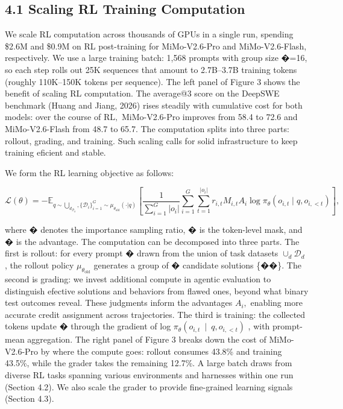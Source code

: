 \documentclass[
  10
]{article}
\begin{document}
\subsection{4.1 Scaling RL Training
Computation}\label{scaling-rl-training-computation}

We scale RL computation across thousands of GPUs in a single run,
spending \$2.6M and \$0.9M on RL post-training for MiMo-V2.6-Pro and
MiMo-V2.6-Flash, respectively. We use a large training batch: 1,568
prompts with group size �=16, so each step rolls out 25K sequences that
amount to 2.7B--3.7B training tokens (roughly 110K--150K tokens per
sequence). The left panel of Figure 3 shows the benefit of scaling RL
computation. The average@3 score on the DeepSWE benchmark (Huang and
Jiang, 2026) rises steadily with cumulative cost for both models: over
the course of \(\mathrm { R L } ,\) MiMo-V2.6-Pro improves from 58.4 to
72.6 and MiMo-V2.6-Flash from 48.7 to 65.7. The computation splits into
three parts: rollout, grading, and training. Such scaling calls for
solid infrastructure to keep training eficient and stable.

We form the RL learning objective as follows:

\[
\mathcal { L } ( \theta ) = - \mathbb { E } _ { q \sim \bigcup _ { d } _ { \mathbf { \mathcal { D } } _ { d } } , \{ \mathbf { \mathcal { D } } _ { i } \} _ { i = 1 } ^ { G } \sim \mu _ { \theta _ { \mathrm { o l d } } } ( \cdot | q ) } \left[ \frac { 1 } { \sum _ { i = 1 } ^ { G } | o _ { i } | } \sum _ { i = 1 } ^ { G } \sum _ { t = 1 } ^ { | o _ { i } | } r _ { i , t } M _ { i , t } A _ { i } \log \pi _ { \theta } ( o _ { i , t } \mid q , o _ { i , < t } ) \right] ,\tag{1}
\]

where � denotes the importance sampling ratio, � is the token-level
mask, and � is the advantage. The computation can be decomposed into
three parts. The first is rollout: for every prompt � drawn from the
union of task datasets \(\cup _ { d } \mathcal { D } _ { d }\) , the
rollout policy \(\mu _ { \theta _ { \mathrm { o l d } } }\) generates a
group of � candidate solutions \{��\}. The second is grading: we invest
additional compute in agentic evaluation to distinguish efective
solutions and behaviors from flawed ones, beyond what binary test
outcomes reveal. These judgments inform the advantages \(A _ { i } ,\)
enabling more accurate credit assignment across trajectories. The third
is training: the collected tokens update � through the gradient of log
\(\pi _ { \theta } ( o _ { i , t } ~ \mid ~ q , o _ { i , < t } )\) ,
with prompt-mean aggregation. The right panel of Figure 3 breaks down
the cost of MiMo-V2.6-Pro by where the compute goes: rollout consumes
43.8\% and training 43.5\%, while the grader takes the remaining 12.7\%.
A large batch draws from diverse RL tasks spanning various environments
and harnesses within one run (Section 4.2). We also scale the grader to
provide fine-grained learning signals (Section 4.3).
\end{document}
